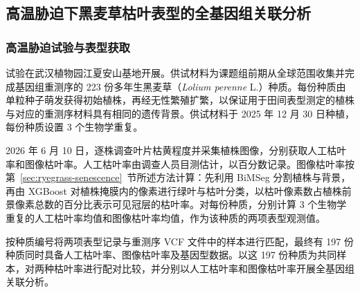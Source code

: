 \subsection{高温胁迫下黑麦草枯叶表型的全基因组关联分析}
\label{sec:ryegrass-heat-gwas}

\subsubsection{高温胁迫试验与表型获取}
\label{sec:ryegrass-heat-phenotyping}
试验在武汉植物园江夏安山基地开展。供试材料为课题组前期从全球范围收集并完成基因组重测序的 223 份多年生黑麦草（\textit{Lolium perenne} L.）种质。每份种质由单粒种子萌发获得初始植株，再经无性繁殖扩繁，以保证用于田间表型测定的植株与对应的重测序材料具有相同的遗传背景。供试材料于 2025 年 12 月 30 日种植，每份种质设置 3 个生物学重复。\par
2026 年 6 月 10 日，逐株调查叶片枯黄程度并采集植株图像，分别获取人工枯叶率和图像枯叶率。人工枯叶率由调查人员目测估计，以百分数记录。图像枯叶率按第~\ref{sec:ryegrass-senescence}~节所述方法计算：先利用 BiMSeg 分割植株与背景，再由 XGBoost 对植株掩膜内的像素进行绿叶与枯叶分类，以枯叶像素数占植株前景像素总数的百分比表示可见冠层的枯叶率。对每份种质，分别计算 3 个生物学重复的人工枯叶率均值和图像枯叶率均值，作为该种质的两项表型观测值。\par
按种质编号将两项表型记录与重测序 VCF 文件中的样本进行匹配，最终有 197 份种质同时具备人工枯叶率、图像枯叶率及基因型数据。以这 197 份种质为共同样本，对两种枯叶率进行配对比较，并分别以人工枯叶率和图像枯叶率开展全基因组关联分析。

